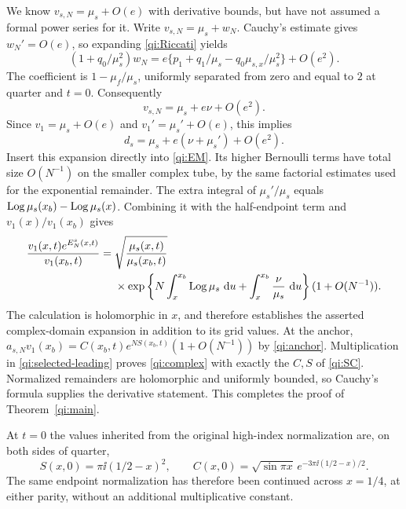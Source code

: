 We know $v_{s,N}=\mu_s+O(e)$ with derivative bounds, but have not assumed a formal power series for it. Write $v_{s,N}=\mu_s+w_N$.
Cauchy's estimate gives $w_N'=O(e)$, so expanding
\eqref{qi:Riccati} yields
\[
 (1+q_0/\mu_s^2)w_N
 =e\{p_1+q_1/\mu_s-q_0\mu_{s,x}/\mu_s^2\}+O(e^2).
\]
The coefficient is $1-\mu_f/\mu_s$, uniformly separated from zero and equal to $2$ at quarter and $t=0$. Consequently
\begin{equation}\label{qi:first-correction}
 v_{s,N}=\mu_s+e\nu+O(e^2).
\end{equation}
Since $v_1=\mu_s+O(e)$ and $v_1'=\mu_s'+O(e)$, this implies
\[
 d_s=\mu_s+e(\nu+\mu_s')+O(e^2).
\]
Insert this expansion directly into \eqref{qi:EM}. Its higher Bernoulli terms have total size $O(N^{-1})$ on the smaller complex tube, by the same factorial estimates used for the exponential remainder. The extra integral of $\mu_s'/\mu_s$ equals
$\operatorname{Log}\mu_s(x_b)-\operatorname{Log}\mu_s(x)$. Combining it with the half-endpoint term and $v_1(x)/v_1(x_b)$ gives
\begin{align}
 \frac{v_1(x,t)e^{E_N^s(x,t)}}{v_1(x_b,t)}
 ={}&\sqrt{\frac{\mu_s(x,t)}{\mu_s(x_b,t)}}\notag\\
 &\times\exp\left\{
 N\int_x^{x_b}\operatorname{Log}\mu_s\,\,\mathrm d u
       +\int_x^{x_b}\frac{\nu}{\mu_s}\,\,\mathrm d u\right\}
       (1+O(N^{-1})).\label{qi:selected-leading}
\end{align}
The calculation is holomorphic in $x$, and therefore establishes
the asserted complex-domain expansion in addition to its grid values. At the anchor,
$a_{s,N}v_1(x_b)=C(x_b,t)e^{NS(x_b,t)}(1+O(N^{-1}))$
by \eqref{qi:anchor}. Multiplication in \eqref{qi:selected-leading} proves
\eqref{qi:complex} with exactly the $C,S$ of \eqref{qi:SC}.
Normalized remainders are holomorphic and uniformly bounded, so Cauchy's formula supplies the derivative statement. This completes the proof of Theorem~\ref{qi:main}.

At $t=0$ the values inherited from the original high-index normalization are, on both sides of quarter,
\[
 S(x,0)=\pi\ii(1/2-x)^2,\qquad
 C(x,0)=\sqrt{\sin\pi x}\,e^{-3\pi\ii(1/2-x)/2}.
\]
The same endpoint normalization has therefore been continued across
$x=1/4$, at either parity, without an additional multiplicative
constant.
